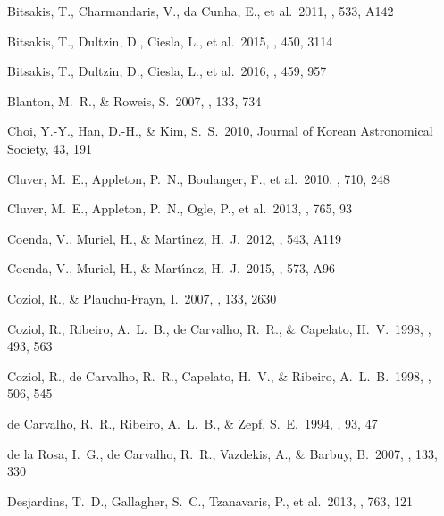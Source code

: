\documentclass[12pt,preprint,apj]{emulateapj}
\begin{document}
\begin{thebibliography}{}
 Bitsakis, T., Charmandaris, V., da Cunha, E., et al.\ 2011, \aap, 533, A142 

 Bitsakis, T., Dultzin, 
D., Ciesla, L., et al.\ 2015, \mnras, 450, 3114

 Bitsakis, T., Dultzin, D., Ciesla, L., et al.\ 2016, \mnras, 459, 957 

 Blanton, M.~R., \& Roweis, S.\ 2007, \aj, 133, 734



 Choi, Y.-Y., Han, D.-H., \& Kim, S.~S.\ 2010, Journal of Korean Astronomical Society, 43, 191 

 Cluver, M.~E., Appleton, P.~N., Boulanger, F., et al.\ 2010, \apj, 710, 248 

 Cluver, M.~E., Appleton, P.~N., Ogle, P., et al.\ 2013, \apj, 765, 93 

 Coenda, V., Muriel, H., \& Mart{\'{\i}}nez, H.~J.\ 2012, \aap, 543, A119 

 Coenda, V., Muriel, H., \& Mart{\'{\i}}nez, H.~J.\ 2015, \aap, 573, A96 

 Coziol, R., \& Plauchu-Frayn, I.\ 2007, \aj, 133, 2630

 Coziol, R., Ribeiro, A.~L.~B., de Carvalho, R.~R., \& Capelato, H.~V.\ 1998, \apj, 493, 563

 Coziol, R., de Carvalho, R.~R., Capelato, H.~V., \& Ribeiro, A.~L.~B.\ 1998, \apj, 506, 545 

 de Carvalho, R.~R., 
Ribeiro, A.~L.~B., \& Zepf, S.~E.\ 1994, \apjs, 93, 47

 de la Rosa, I.~G., 
de Carvalho, R.~R., Vazdekis, A., \& Barbuy, B.\ 2007, \aj, 133, 330

 Desjardins, T.~D., Gallagher, S.~C., Tzanavaris, P., et al.\ 2013, \apj, 763, 121


\end{thebibliography}
\end{document}
